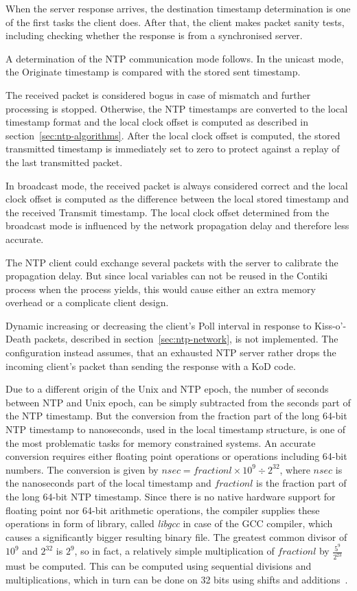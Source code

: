 

When the server response arrives,
the destination timestamp determination is one of the first tasks the client does.
After that, the client makes packet sanity tests, including
checking whether the response is from a synchronised server.

A determination of the NTP communication mode follows.
In the unicast mode, the Originate timestamp is compared with the stored sent timestamp.

The received packet is considered bogus in case of mismatch and further processing is stopped.
Otherwise, the NTP timestamps are converted to the local timestamp format and
the local clock offset is computed as described in section~\ref{sec:ntp-algorithms}.
After the local clock offset is computed,
the stored transmitted timestamp is immediately set to zero
to protect against a replay of the last transmitted packet.

In broadcast mode, the received packet is always considered correct
and the local clock offset is computed as the difference between the local stored timestamp
and the received Transmit timestamp.
The local clock offset determined from the broadcast mode
is influenced by the network propagation delay and therefore less accurate.

The NTP client could exchange several packets with the server to calibrate the propagation delay.
But since local variables can not be reused in the Contiki process when the process yields,
this would cause either an extra memory overhead or a complicate client design.


Dynamic increasing or decreasing the client's Poll interval in response to
Kiss-o'-Death packets, described in section~\ref{sec:ntp-network}, is not implemented.
The configuration instead assumes, that an exhausted NTP server rather drops the incoming
client's packet than sending the response with a KoD code.



Due to a different origin of the Unix and NTP epoch,
the number of seconds between NTP and Unix epoch,
can be simply subtracted from the seconds part of the NTP timestamp.
But the conversion from the fraction part of the long 64-bit NTP timestamp to nanoseconds,
used in the local timestamp structure,
is one of the most problematic tasks for memory constrained systems.
An accurate conversion requires either floating point operations or operations including 64-bit numbers.
The conversion is given by
$nsec = fractionl \times 10^9 \div 2^{32}$, where $nsec$ is the nanoseconds part of the local timestamp
and $fractionl$ is the fraction part of the long 64-bit NTP timestamp.
Since there is no native hardware support for floating point nor 64-bit arithmetic operations,
the compiler supplies these operations in form of library, called {\it{libgcc}} in case of the GCC compiler,
which causes a significantly bigger resulting binary file.
The greatest common divisor of $10^9$ and $2^{32}$ is $2^9$,
so in fact, a relatively simple multiplication of $fractionl$ by $\frac{5^9}{2^{23}}$ must be computed.
This can be computed using sequential divisions and multiplications, which
in turn can be done on 32 bits using shifts and additions~\cite{c99}.

